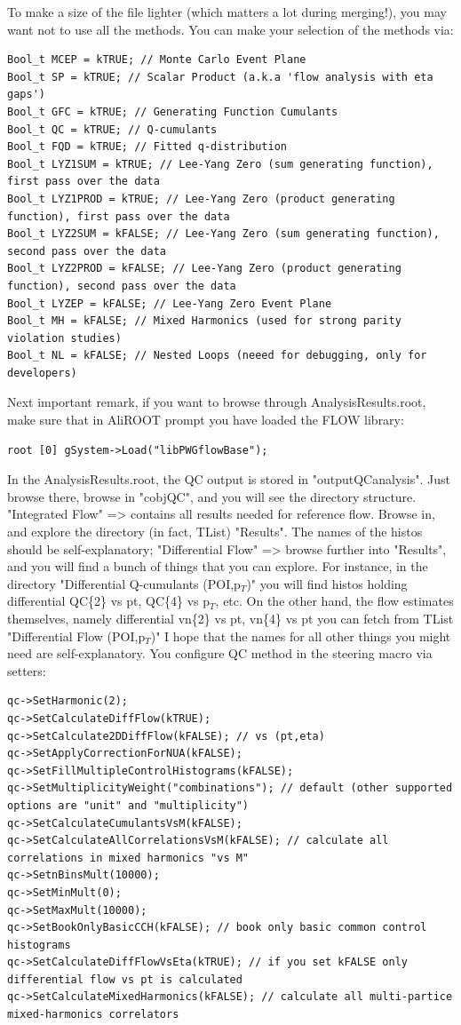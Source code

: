 \documentclass[a4paper]{book}
\numberwithin{equation}{subsection}
\begin{document}
 To make a size of the file lighter (which matters a lot during merging!), you may want not to use all the methods. You can make your selection of the methods via:
 	\begin{lstlisting}
Bool_t MCEP = kTRUE; // Monte Carlo Event Plane
Bool_t SP = kTRUE; // Scalar Product (a.k.a 'flow analysis with eta gaps')
Bool_t GFC = kTRUE; // Generating Function Cumulants
Bool_t QC = kTRUE; // Q-cumulants
Bool_t FQD = kTRUE; // Fitted q-distribution
Bool_t LYZ1SUM = kTRUE; // Lee-Yang Zero (sum generating function), first pass over the data
Bool_t LYZ1PROD = kTRUE; // Lee-Yang Zero (product generating function), first pass over the data
Bool_t LYZ2SUM = kFALSE; // Lee-Yang Zero (sum generating function), second pass over the data
Bool_t LYZ2PROD = kFALSE; // Lee-Yang Zero (product generating function), second pass over the data
Bool_t LYZEP = kFALSE; // Lee-Yang Zero Event Plane
Bool_t MH = kFALSE; // Mixed Harmonics (used for strong parity violation studies) 
Bool_t NL = kFALSE; // Nested Loops (neeed for debugging, only for developers) 	\end{lstlisting}
 Next important remark, if you want to browse through AnalysisResults.root, make sure that in AliROOT prompt you have loaded the FLOW library:
 	\begin{lstlisting}
root [0] gSystem->Load("libPWGflowBase"); 	\end{lstlisting}
 In the AnalysisResults.root, the QC output is stored in "outputQCanalysis". Just browse there, browse in "cobjQC", and you will see the directory structure.
 "Integrated Flow" => contains all results needed for reference flow. Browse in, and explore the directory (in fact, TList) "Results". The names of the histos should be self-explanatory;
 "Differential Flow" => browse further into "Results", and you will find a bunch of things that you can explore. For instance, in the directory "Differential Q-cumulants (POI,p$_{T}$)" you will find histos holding differential QC\{2\} vs pt, QC\{4\} vs p$_{T}$, etc. On the other hand, the flow estimates themselves, namely differential vn\{2\} vs pt, vn\{4\} vs pt you can fetch from TList "Differential Flow (POI,p$_{T}$)"
 I hope that the names for all other things you might need are self-explanatory. 
 You configure QC method in the steering macro via setters:
 	\begin{lstlisting}
qc->SetHarmonic(2);
qc->SetCalculateDiffFlow(kTRUE);
qc->SetCalculate2DDiffFlow(kFALSE); // vs (pt,eta)
qc->SetApplyCorrectionForNUA(kFALSE);
qc->SetFillMultipleControlHistograms(kFALSE); 
qc->SetMultiplicityWeight("combinations"); // default (other supported options are "unit" and "multiplicity")
qc->SetCalculateCumulantsVsM(kFALSE);
qc->SetCalculateAllCorrelationsVsM(kFALSE); // calculate all correlations in mixed harmonics "vs M"
qc->SetnBinsMult(10000);
qc->SetMinMult(0);
qc->SetMaxMult(10000); 
qc->SetBookOnlyBasicCCH(kFALSE); // book only basic common control histograms
qc->SetCalculateDiffFlowVsEta(kTRUE); // if you set kFALSE only differential flow vs pt is calculated
qc->SetCalculateMixedHarmonics(kFALSE); // calculate all multi-partice mixed-harmonics correlators	\end{lstlisting}
\end{document}
